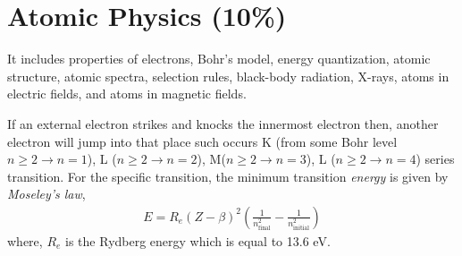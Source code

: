 
\section{Atomic Physics (10\%)}

It includes properties of electrons, Bohr's model, energy quantization, atomic structure, atomic spectra, selection rules, black-body radiation, X-rays, atoms in electric fields, and atoms in magnetic fields.

If an external electron strikes and knocks the innermost electron then, another electron will jump into that place such occurs K (from some Bohr level $n \geq 2 \to n = 1$), L ($n \geq 2 \to n = 2$), M($n \geq 2 \to n = 3$), L ($n \geq 2 \to n = 4$) series transition. For the specific transition, the minimum transition \emph{energy} is given by \emph{Moseley's law},
\begin{align}
E = R_{e} (Z - \beta)^{2} \left( \frac{1}{n_{\text{final}}^{2}} - \frac{1}{n_{\text{initial}}^{2}} \right)
\end{align}
where, $R_{e}$ is the Rydberg energy which is equal to 13.6 eV.